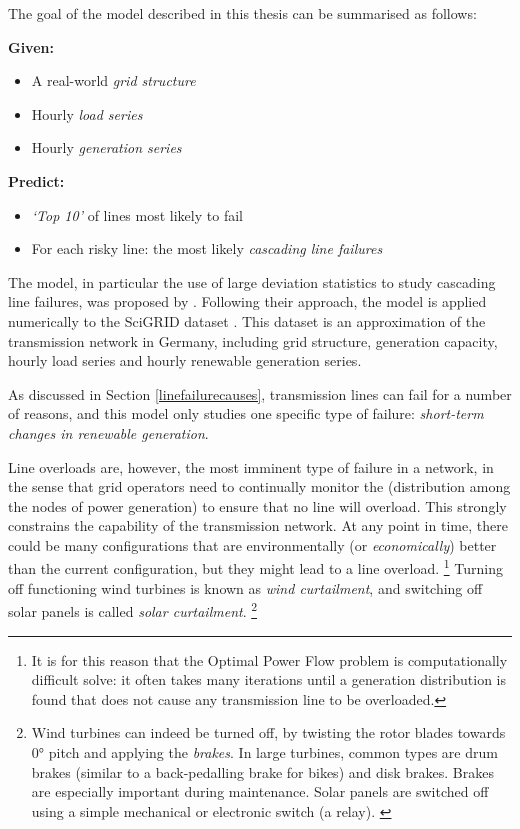 \documentclass[main.tex]{subfiles}
\begin{document}
The goal of the model described in this thesis can be summarised as follows:


\textbf{Given:}
\begin{itemize}
    \item A real-world \emph{grid structure}
    \item Hourly \emph{load series}
    \item Hourly \emph{generation series}
\end{itemize}

\textbf{Predict:}
\begin{itemize}
    \item \emph{`Top 10'} of lines most likely to fail
    \item For each risky line: the most likely \emph{cascading line failures}
\end{itemize}

The model, in particular the use of large deviation statistics to study cascading line failures, was proposed by \citet{Nesti2018emergentfailures}.\nocite{Nesti2018supplemental} Following their approach, the model is applied numerically to the SciGRID dataset \citep{SciGRIDv0.2}. This dataset is an approximation of the transmission network in Germany, including grid structure, generation capacity, hourly load series and hourly renewable generation series.

As discussed in Section \ref{linefailurecauses}, transmission lines can fail for a number of reasons, and this model only studies one specific type of failure: \emph{short-term changes in renewable generation}.






Line overloads are, however, the most imminent type of failure in a network, in the sense that grid operators need to continually monitor the  (distribution among the nodes of power generation) to ensure that no line will overload.
This strongly constrains the capability of the transmission network. At any point in time, there could be many configurations that are environmentally (or \emph{economically}) better than the current configuration, but they might lead to a line overload.%
\footnote{It is for this reason that the Optimal Power Flow problem is computationally difficult solve: it often takes many iterations until a generation distribution is found that does not cause any transmission line to be overloaded.}
Turning off functioning wind turbines is known as \emph{wind curtailment}, and switching off solar panels is called \emph{solar curtailment}.%
\footnote{Wind turbines can indeed be turned off, by twisting the rotor blades towards $0\si{\degree}$ pitch and applying the \emph{brakes}. In large turbines, common types are drum brakes (similar to a back-pedalling brake for bikes) and disk brakes. Brakes are especially important during maintenance.
Solar panels are switched off using a simple mechanical or electronic switch (a relay). \citep{Denholm2015}}
\end{document}
